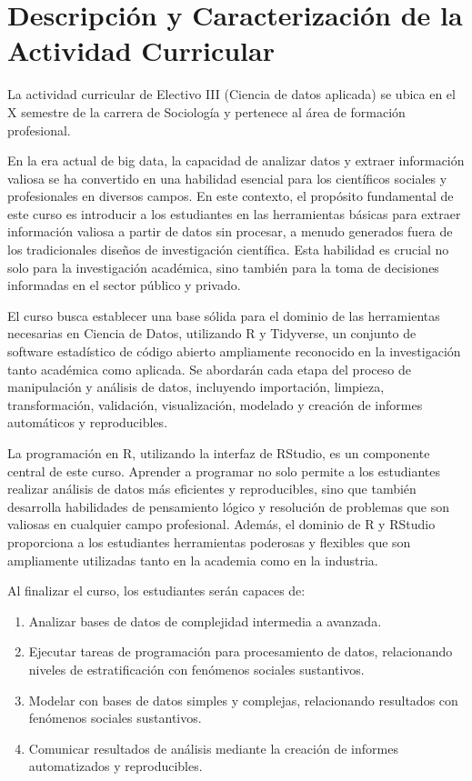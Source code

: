 \documentclass[11pt,letter,]{article}
\providecommand{\tightlist}{%
  \setlength{\itemsep}{0pt}\setlength{\parskip}{0pt}}
\begin{document}
\hypertarget{descripciuxf3n-y-caracterizaciuxf3n-de-la-actividad-curricular}{%
\section{Descripción y Caracterización de la Actividad
Curricular}\label{descripciuxf3n-y-caracterizaciuxf3n-de-la-actividad-curricular}}

La actividad curricular de Electivo III (Ciencia de datos aplicada) se
ubica en el X semestre de la carrera de Sociología y pertenece al área
de formación profesional.

En la era actual de big data, la capacidad de analizar datos y extraer
información valiosa se ha convertido en una habilidad esencial para los
científicos sociales y profesionales en diversos campos. En este
contexto, el propósito fundamental de este curso es introducir a los
estudiantes en las herramientas básicas para extraer información valiosa
a partir de datos sin procesar, a menudo generados fuera de los
tradicionales diseños de investigación científica. Esta habilidad es
crucial no solo para la investigación académica, sino también para la
toma de decisiones informadas en el sector público y privado.

El curso busca establecer una base sólida para el dominio de las
herramientas necesarias en Ciencia de Datos, utilizando R y Tidyverse,
un conjunto de software estadístico de código abierto ampliamente
reconocido en la investigación tanto académica como aplicada. Se
abordarán cada etapa del proceso de manipulación y análisis de datos,
incluyendo importación, limpieza, transformación, validación,
visualización, modelado y creación de informes automáticos y
reproducibles.

La programación en R, utilizando la interfaz de RStudio, es un
componente central de este curso. Aprender a programar no solo permite a
los estudiantes realizar análisis de datos más eficientes y
reproducibles, sino que también desarrolla habilidades de pensamiento
lógico y resolución de problemas que son valiosas en cualquier campo
profesional. Además, el dominio de R y RStudio proporciona a los
estudiantes herramientas poderosas y flexibles que son ampliamente
utilizadas tanto en la academia como en la industria.

Al finalizar el curso, los estudiantes serán capaces de:

\begin{enumerate}
\def\labelenumi{\arabic{enumi}.}
\tightlist
\item
  Analizar bases de datos de complejidad intermedia a avanzada.
\item
  Ejecutar tareas de programación para procesamiento de datos,
  relacionando niveles de estratificación con fenómenos sociales
  sustantivos.
\item
  Modelar con bases de datos simples y complejas, relacionando
  resultados con fenómenos sociales sustantivos.
\item
  Comunicar resultados de análisis mediante la creación de informes
  automatizados y reproducibles.
\end{enumerate}
\end{document}
